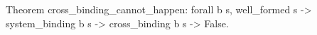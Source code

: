 Theorem cross_binding_cannot_happen:
  forall b s, well_formed s -> system_binding b s ->
              cross_binding b s  -> False.